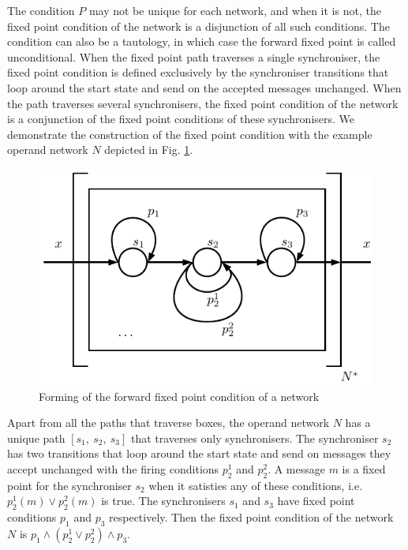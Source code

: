 The condition $P$ may not be unique for each network, and when it is not, the fixed point condition of the network is a disjunction of all such conditions. The condition can also be a tautology, in which case the forward fixed point is called unconditional. When the fixed point path traverses a single synchroniser, the fixed point condition is defined exclusively by the synchroniser transitions that loop around the start state and send on the accepted messages unchanged. When the path traverses several synchronisers, the fixed point condition of the network is a conjunction of the fixed point conditions of these synchronisers. We demonstrate the construction of the fixed point condition with the example operand network $N$ depicted in Fig. \ref{fig:ffp}.

\begin{figure}[h!]
\centering
\includegraphics[scale=0.8]{figs/chapter_04_ffp.pdf}
\caption{Forming of the forward fixed point condition of a network}
\label{fig:ffp}
\end{figure}

Apart from all the paths that traverse boxes, the operand network $N$ has a unique path $[s_1, \: s_2, \: s_3]$ that traverses only synchronisers. The synchroniser $s_2$ has two transitions that loop around the start state and send on messages they accept unchanged with the firing conditions $p^{1}_2$ and $p^{2}_2$. A message $m$ is a fixed point for the synchroniser $s_2$ when it satisties any of these conditions, i.e. $p^{1}_2(m) \lor p^{2}_2(m)$ is true. The synchronisers $s_1$ and $s_3$ have fixed point conditions $p_1$ and $p_3$ respectively. Then the fixed point condition of the network $N$ is $p_1 \land (p^{1}_2 \lor p^{2}_2) \land p_3$.

